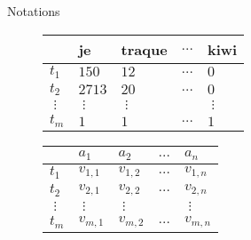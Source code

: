 \documentclass[xcolor={svgnames}, french]{beamer}
\begin{document}
\begin{frame}[fragile]{Notations}
	\begin{overprint}
			\begin{figure}
				\begin{tabu} to 0.9
							& je     & traque     & $…$ & kiwi\\
					\hline
					$t_1$   & $150$ & $12$ & $…$ & $0$\\
					$t_2$   & $2713$ & $20$ & $…$ & $0$\\
					$⋮$    & $⋮$      & $⋮$       &     & $⋮$\\
					$t_m$   & $1$ & $1$ & $…$ & $1$\\
				 \end{tabu}
			\end{figure}
			\begin{figure}
				\begin{tabu} to 0.9
							& $a_1$     & $a_2$     & $…$ & $a_n$\\
					\hline
					$t_1$   & $v_{1,1}$ & $v_{1,2}$ & $…$ & $v_{1,n}$\\
					$t_2$   & $v_{2,1}$ & $v_{2,2}$ & $…$ & $v_{2,n}$\\
					$⋮$    & $⋮$      & $⋮$       &     & $⋮$\\
					$t_m$   & $v_{m,1}$ & $v_{m,2}$ & $…$ & $v_{m,n}$\\
				 \end{tabu}
			\end{figure}
	\end{overprint}

\end{frame}

\end{document}
